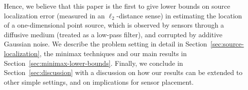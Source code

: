 \documentclass[conference]{IEEEtran}
\begin{document}
Hence, we believe that this paper is the first to give lower bounds on source
localization error (measured in an $\ell_2$-distance sense) in estimating the
location of a one-dimensional point source, which is observed by sensors
through a diffusive medium (treated as a low-pass filter), and corrupted by
additive Gaussian noise. We describe the problem setting in detail in
Section~\ref{sec:source-localization}, the minimax techniques and our main
results in Section~\ref{sec:minimax-lower-bounds}. Finally, we conclude in
Section~\ref{sec:discussion} with a discussion on how our results can be
extended to other simple settings, and on implications for sensor placement.




\end{document}
